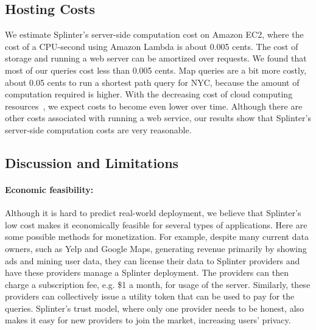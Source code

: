 \subsection{Hosting Costs}
\label{sec:pricing}
We estimate Splinter's server-side computation cost on Amazon EC2, 
where the cost of a CPU-second using Amazon Lambda is about 0.005 cents. 
The cost of storage and running a web server can be amortized over requests.
We found that most of our queries cost less than 0.005 cents. Map queries are a bit more costly,
about 0.05 cents to run a shortest path query for NYC, because the amount of 
computation required is higher. With the decreasing cost of cloud computing resources~\cite{decrease-aws},
we expect costs to become even lower over time. Although there are other costs associated with running a web service,
our results show that Splinter's server-side computation costs are very reasonable.


\subsection{Discussion and Limitations}
\label{spl-sec:discussion}

\paragraph{Economic feasibility:}
\label{sec:disc-economics}

Although it is hard to predict real-world deployment, we believe that Splinter's low cost makes it economically feasible for several types of applications.
Here are some possible methods for monetization.
For example, despite many current data owners, such as Yelp and Google Maps, generating revenue primarily by showing ads and mining user data,
they can license their data to Splinter providers and have these providers manage a Splinter deployment. The providers
can then charge a subscription fee, e.g. \$1 a month, for usage of the server.
Similarly, these providers can collectively issue a utility token that
can be used to pay for the queries.
Splinter's trust model, where only one provider needs to be honest, also makes 
it easy for new providers to join the market, increasing users' privacy.

